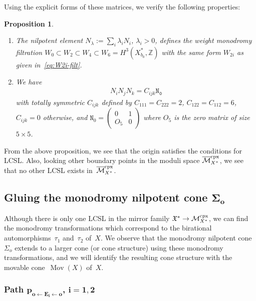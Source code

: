 \documentclass[pdftex]{sigma}
\numberwithin{equation}{section}
\newtheorem{Proposition}[Theorem]{Proposition}
\begin{document}
Using the explicit forms of these matrices, we verify the following properties:
\begin{Proposition}\quad
\begin{enumerate}\itemsep=0pt \item[{\rm (1)}] The nilpotent element $N_{\lambda}:=\sum_{i}\lambda_{i}N_{i}$, $\lambda_{i}>0$, defines the weight monodromy filtration $W_{0}\subset W_{2}\subset W_{4}\subset W_{6}=H^{3}(X_{b_{0}}^{*},\mathbb{Z})$ with the same form $W_{2i}$ as given in~\eqref{eq:W2i-filt}.

\item[{\rm (2)}] We have
\begin{gather*}
N_{i}N_{j}N_{k}=C_{ijk}\mathtt{N_{0}}
\end{gather*}
with totally symmetric $C_{ijk}$ defined by $C_{111}=C_{222}=2$, $C_{122}=C_{112}=6$, $C_{ijk}=0$ otherwise, and $\mathtt{N}_{0}=\left(\begin{smallmatrix}0 & 1\\
O_{5} & 0
\end{smallmatrix}\right)$ where $O_{5}$ is the zero matrix of size $5\times5$.
\end{enumerate}
\end{Proposition}

From the above proposition, we see that the origin satisfies the conditions for LCSL. Also, looking other boundary points in the moduli space
$\overline{\mathcal{M}}_{X^{*}}^{\rm cpx}$, we see that no other LCSL exists in~$\overline{\mathcal{M}}_{X^{*}}^{\rm cpx}$.

\subsection[Gluing the monodromy nilpotent cone $\Sigma_{o}$]{Gluing the monodromy nilpotent cone $\boldsymbol{\Sigma_{o}}$}

Although there is only one LCSL in the mirror family $\mathfrak{X}^{*}\to\mathcal{M}_{X^{*}}^{\rm cpx}$, we can find the monodromy transformations which correspond to the birational automorphisms~$\tau_{1}$ and~$\tau_{2}$ of~$X$. We observe that the monodromy nilpotent cone $\Sigma_{o}$ extends to a larger cone (or cone structure) using these monodromy transformations, and we will identify the resulting cone structure with the movable cone~$\operatorname{Mov}(X)$ of~$X$.

\subsubsection[Path $p_{o\leftarrow E_i\leftarrow o}$, $i=1,2$]{Path $\boldsymbol{p_{o\leftarrow E_i\leftarrow o}}$, $\boldsymbol{i=1,2}$}
\end{document}
